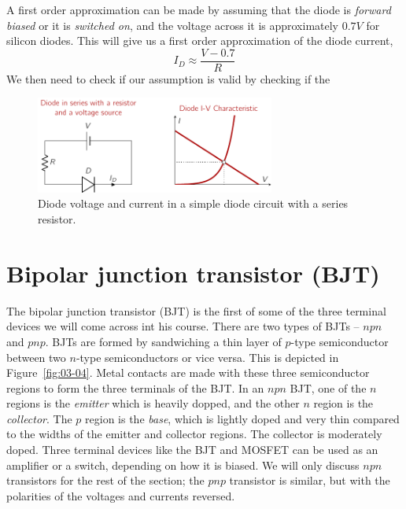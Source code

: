A first order approximation can be made by assuming that the diode is \textit{forward biased} or it is \textit{switched on}, and the voltage across it is approximately $0.7 V$ for silicon diodes. This will give us a first order approximation of the diode current,
\begin{equation}
    I_D \approx \frac{V - 0.7}{R}
    \label{eq:ch03-diode-resistor-id-approx}
\end{equation}
We then need to check if our assumption is valid by checking if the 

\begin{figure}[t]
    \centering
    \includegraphics[width=0.7\textwidth]{figure/ch03/fig03-diode-resistor-ckt.pdf}
    \caption{Diode voltage and current in a simple diode circuit with a series resistor.}
    \label{fig:03-diode-resistor-ckt}
\end{figure}

\section{Bipolar junction transistor (BJT)}
The bipolar junction transistor (BJT) is the first of some of the three terminal devices we will come across int his course. There are two types of BJTs -- $npn$ and $pnp$. BJTs are formed by sandwiching a thin layer of $p$-type semiconductor between two $n$-type semiconductors or vice versa. This is depicted in Figure~\ref{fig:03-04}. Metal contacts are made with these three semiconductor regions to form the three terminals of the BJT. In an $npn$ BJT, one of the  $n$ regions is the \textit{emitter} which is heavily dopped, and the other $n$ region is the \textit{collector}. The $p$ region is the \textit{base}, which is lightly doped and very thin compared to the widths of the emitter and collector regions. The collector is moderately doped. Three terminal devices like the BJT and MOSFET can be used as an amplifier or a switch, depending on how it is biased. We will only discuss $npn$ transistors for the rest of the section; the $pnp$ transistor is similar, but with the polarities of the voltages and currents reversed.

